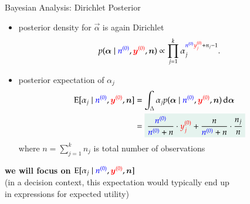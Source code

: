 \documentclass{beamer}
\def\rot#1{{\color{red}#1}}
\def\gruen#1{{\color{blue}#1}}
\def\byzr{\rot{\byz}}
\def\bynr{\rot{\byn}}
\def\yzjr{\rot{y\uz_j}}
\def\nzg{\gruen{\nz}}
\def\nng{\gruen{\nn}}
\begin{document}
\begin{frame}{Bayesian Analysis: Dirichlet Posterior}
  \begin{itemize}
  \item posterior density for $\vec{\alpha}$ is again Dirichlet
    \begin{align*}
      p(\vec{\alpha}\mid\nzg,\byzr,\vec{n})
      \propto
      \prod_{j=1}^k\alpha_j^{\nzg\yzjr+n_j-1}.
    \end{align*}
  \item posterior expectation of $\alpha_j$
    \begin{align*}
      \E[\alpha_j\mid\nzg,\byzr,\vec{n}]
      &=
      \int_{\Delta}\alpha_j p(\vec{\alpha}\mid\nzg,\byzr,\vec{n})\dd\vec{\alpha} \\
      &=
      \colorbox{lmugreen!10!white}{$\displaystyle
      \frac{\nzg}{\nzg+n} \cdot \yzjr + \frac{n}{\nzg+n} \cdot \frac{n_j}{n}
      $}
    \end{align*}
    where $n=\sum_{j=1}^k n_j$ is total number of observations
  \end{itemize}
  \begin{center}
    \textbf{we will focus on $\E[\alpha_j\mid\nzg,\byzr,\vec{n}]$} \\
    (in a decision context, this expectation would typically end up \\
    in expressions for expected utility)
  \end{center}
\end{frame}

\end{document}
